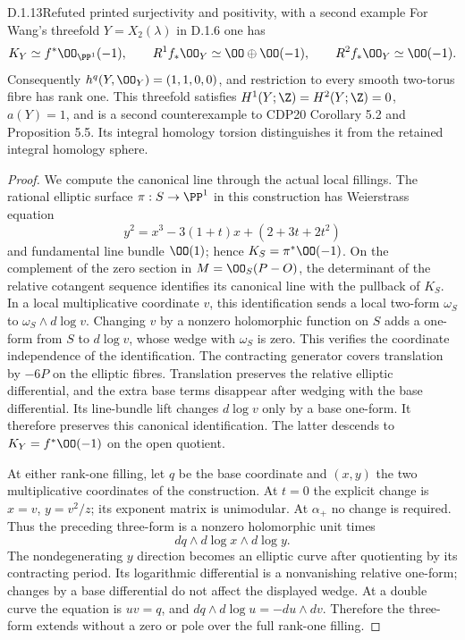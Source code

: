 
\begin{idstatement}{D.1.13}{Refuted printed surjectivity and positivity, with a second example}
\label{st:D.1.13}
For Wang's threefold $Y=X_2(\lambda)$ in D.1.6 one has
\[
K_Y\simeq f^*\OO_{\PP^1}(-1),\qquad
R^1f_*\OO_Y\simeq\OO\oplus\OO(-1),\qquad
R^2f_*\OO_Y\simeq\OO(-1).
\]
Consequently $h^q(Y,\OO_Y)=(1,1,0,0)$, and restriction to every
smooth two-torus fibre has rank one. This threefold satisfies
$H^1(Y;\Z)=H^2(Y;\Z)=0$, $a(Y)=1$, and is a second
counterexample to CDP20 Corollary 5.2 and Proposition 5.5.
Its integral homology torsion distinguishes it from the retained
integral homology sphere.
\end{idstatement}
\begin{proof}
We compute the canonical line through the actual local fillings.
The rational elliptic surface $\pi:S\to\PP^1$ in this construction
has Weierstrass equation
\[
y^2=x^3-3(1+t)x+(2+3t+2t^2)
\]
and fundamental line bundle $\OO(1)$; hence
$K_S=\pi^*\OO(-1)$. On the complement of the zero section in
$M=\OO_S(P-O)$, the determinant of the relative cotangent sequence
identifies its canonical line with the pullback of $K_S$.
In a local multiplicative coordinate $v$, this identification sends
a local two-form $\omega_S$ to $\omega_S\wedge d\log v$.
Changing $v$ by a nonzero holomorphic function on $S$ adds a
one-form from $S$ to $d\log v$, whose wedge with $\omega_S$ is zero.
This verifies the coordinate independence of the identification.
The contracting generator covers translation by $-6P$ on the
elliptic fibres. Translation preserves the relative elliptic
differential, and the extra base terms disappear after wedging
with the base differential. Its line-bundle lift changes $d\log v$
only by a base one-form. It therefore preserves this canonical
identification. The latter descends to
$K_Y=f^*\OO(-1)$ on the open quotient.

At either rank-one filling, let $q$ be the base coordinate and
$(x,y)$ the two multiplicative coordinates of the construction.
At $t=0$ the explicit change is $x=v$, $y=v^2/z$; its exponent
matrix is unimodular. At $\alpha_+$ no change is required.
Thus the preceding three-form is a nonzero holomorphic unit times
\[
dq\wedge d\log x\wedge d\log y.
\]
The nondegenerating $y$ direction becomes an elliptic curve after
quotienting by its contracting period. Its logarithmic differential
is a nonvanishing relative one-form; changes by a base differential
do not affect the displayed wedge. At a double curve the equation
is $uv=q$, and
$dq\wedge d\log u=-du\wedge dv$. Therefore the three-form extends
without a zero or pole over the full rank-one filling.


\end{proof}
